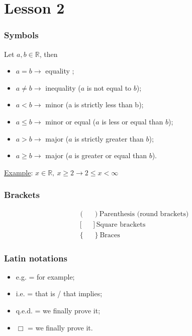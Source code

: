 \documentclass{article}
\begin{document}
\newpage
\part{Lesson 2}

\section{Symbols}
Let $a,b \in \mathbb{R}$, then
\begin{itemize}[label=--]
    \item $a=b \rightarrow$ equality ;
    \item $a \neq b \rightarrow$ inequality ($a$ is not equal to $b$);
    \item $a<b \rightarrow$ minor (a is strictly less than b);
    \item $a\leq b \rightarrow$ minor or equal ($a$ is less or equal than $b$);
    \item $a>b \rightarrow$ major ($a$ is strictly greater than $b$);
    \item $a\geq b \rightarrow$ major ($a$ is greater or equal than $b$).
\end{itemize}

\underline{Example}: $x \in \mathbb{R},\ x \geq 2 \rightarrow 2 \leq x < \infty$

\section{Brackets}
\begin{align}
    &\left(\phantom{-}\right) \text{Parenthesis (round brackets)}\\
    &\left[\phantom{-}\right] \text{Square brackets}\\
    &\left\{\phantom{-}\right\} \text{Braces}
\end{align}

\section{Latin notations}
\begin{itemize}
    \item e.g. = for example;
    \item i.e. = that is / that implies;
    \item q.e.d. = we finally prove it;
    \item $\Box$ = we finally prove it. 
\end{itemize}
\end{document}
